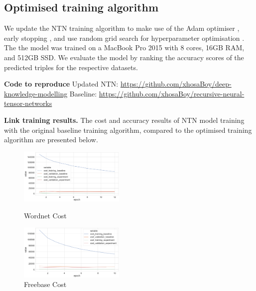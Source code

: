 
\subsection{Optimised training algorithm}

\noindent We update the NTN training algorithm to make use of the Adam optimiser \citep{kingma2014adam}, early stopping \citep{prechelt1998early}, and use random grid search for hyperparameter optimisation \citep{bergstra2012random}. The the model was trained on a MacBook Pro 2015 with 8 cores, 16GB RAM, and 512GB SSD. We evaluate the model by ranking the accuracy scores of the predicted triples for the respective datasets. \par

\noindent \textbf{Code to reproduce} \newline
Updated NTN:  \url{https://github.com/xhosaBoy/deep-knowledge-modelling} \newline
Baseline: \url{https://github.com/xhosaBoy/recursive-neural-tensor-networks}

\noindent \textbf{Link training results.} The cost and accuracy results of NTN model training with the original baseline training algorithm, compared to the optimised training algorithm are presented below.

\begin{figure}[H]
	\parbox{.5\linewidth}{
   		\centering
    		\includegraphics[width=0.45\textwidth, height=0.2\textheight]{Wordnet_Cost_Results_Early_Stopping}
		\caption{Wordnet Cost}
		}
	\hfill
	\parbox{.5\linewidth}{
   		\centering
		\includegraphics[width=0.45\textwidth, height=0.2\textheight]{Freebase_Cost_Results}
		\caption{Freebase Cost}
		}
\end{figure}

